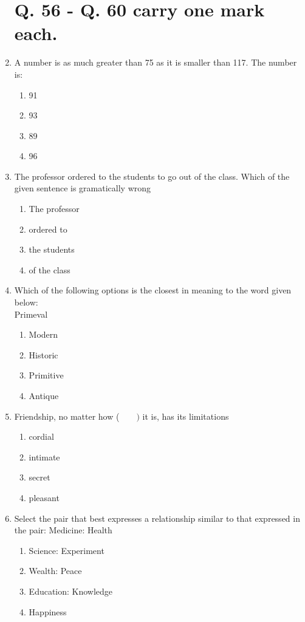 \documentclass[journal]{IEEEtran}
\begin{document}
\begin{enumerate}
  \section*{Q. 56 - Q. 60 carry one mark each.}
  \item  A number is as much greater than 75 as it is smaller than 117. The number is:
   \begin{multicols}{4}
			\begin{enumerate}
\item 91
\item  93
\item89
\item 96
   \end{enumerate}
		\end{multicols}
  \item The professor ordered to the students to go out of the class.
Which of the given sentence is gramatically wrong

   \begin{multicols}{4}
			\begin{enumerate}
   \item  The professor
\item ordered  to
\item the students
\item of the class
\end{enumerate}
		\end{multicols}
  \item Which of the following options is the closest in meaning to the word given below:\\
  Primeval
   \begin{multicols}{4}
			\begin{enumerate}
   \item  Modern
\item Historic
\item Primitive 
\item Antique
\end{enumerate}
		\end{multicols}
  \item Friendship, no matter how ($\qquad)$ it is, has its limitations
  \begin{multicols}{4}
			\begin{enumerate}
\item cordial
\item intimate
\item secret
\item pleasant
\end{enumerate}
		\end{multicols}
  \item Select the pair that best expresses a relationship similar to that expressed in the pair: Medicine: Health
   \begin{multicols}{1}
			\begin{enumerate}
  \item Science: Experiment
\item Wealth: Peace
\item Education: Knowledge
\item Happiness 
\end{enumerate}
		\end{multicols}

\end{enumerate}
\end{document}

